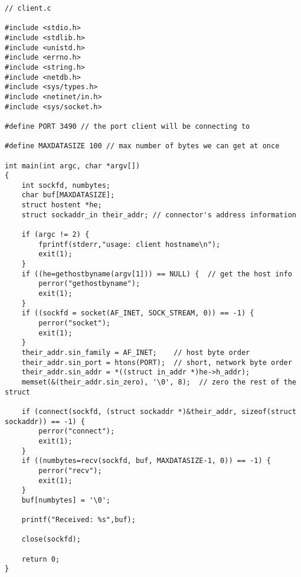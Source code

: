 \documentclass[a4paper]{article}
\begin{document}
\begin{lstlisting}
// client.c

#include <stdio.h>
#include <stdlib.h>
#include <unistd.h>
#include <errno.h>
#include <string.h>
#include <netdb.h>
#include <sys/types.h>
#include <netinet/in.h>
#include <sys/socket.h>

#define PORT 3490 // the port client will be connecting to

#define MAXDATASIZE 100 // max number of bytes we can get at once

int main(int argc, char *argv[])
{
    int sockfd, numbytes;
    char buf[MAXDATASIZE];
    struct hostent *he;
    struct sockaddr_in their_addr; // connector's address information

    if (argc != 2) {
        fprintf(stderr,"usage: client hostname\n");
        exit(1);
    }
    if ((he=gethostbyname(argv[1])) == NULL) {  // get the host info
        perror("gethostbyname");
        exit(1);
    }
    if ((sockfd = socket(AF_INET, SOCK_STREAM, 0)) == -1) {
        perror("socket");
        exit(1);
    }
    their_addr.sin_family = AF_INET;    // host byte order
    their_addr.sin_port = htons(PORT);  // short, network byte order
    their_addr.sin_addr = *((struct in_addr *)he->h_addr);
    memset(&(their_addr.sin_zero), '\0', 8);  // zero the rest of the struct

    if (connect(sockfd, (struct sockaddr *)&their_addr, sizeof(struct sockaddr)) == -1) {
        perror("connect");
        exit(1);
    }
    if ((numbytes=recv(sockfd, buf, MAXDATASIZE-1, 0)) == -1) {
        perror("recv");
        exit(1);
    }
    buf[numbytes] = '\0';

    printf("Received: %s",buf);

    close(sockfd);

    return 0;
}
\end{lstlisting}
\end{document}
